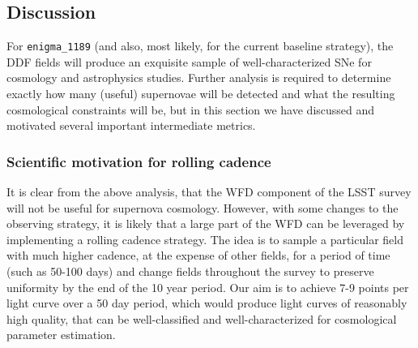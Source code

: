 %
%
%
%
%
%


\subsection{Discussion}
For \texttt{enigma\_1189} (and also, most likely, for the current baseline strategy), the DDF
fields will produce an exquisite sample of
well-characterized SNe for cosmology and astrophysics studies. Further analysis is required to
determine exactly how many (useful) supernovae will be detected and what the resulting cosmological
constraints will be, but in this section we have discussed and motivated several important
intermediate metrics.

\subsubsection{Scientific motivation for rolling cadence}
It is clear from the above analysis, that the WFD component of the LSST survey will not be useful
for supernova cosmology. However, with some changes to the observing strategy, it is likely that a
large part of the WFD can be leveraged by implementing a rolling cadence strategy. The idea is to
sample a particular field with much higher cadence, at the expense of other fields, for a period of
time (such as 50-100 days) and change fields throughout the survey to preserve uniformity by the end
of the 10 year period.
Our aim is to achieve 7-9 points per light
curve over a 50 day period, which would produce light curves of reasonably high quality, that
can be well-classified and well-characterized for cosmological parameter estimation.

